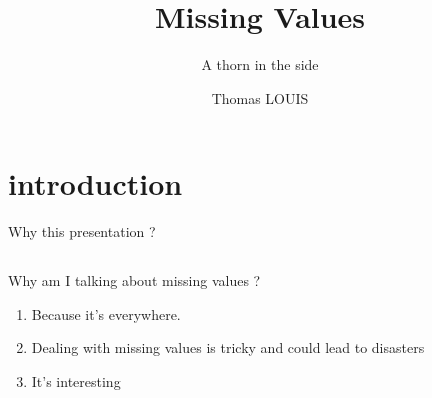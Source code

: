 \documentclass{beamer}
\title{Missing Values}
\subtitle{A thorn in the side}
\author{Thomas LOUIS}\institute{Data scientist}
\begin{document}
\begin{frame}
\titlepage
\end{frame}


\section{introduction}
\begin{frame}
	\begin{center}
	\Large Why this presentation ?
	\end{center}
\end{frame}

\begin{frame}
\end{frame}

%
%
\subsection[Missing values in Data Driven Business]{}
\begin{frame}
	Why am I talking about missing values ?
        \begin{enumerate}
		\item<1- | alert@1> Because it's everywhere.
		\item<2- | alert@2> Dealing with missing values is tricky and could lead to disasters  
		\item<3- | alert@3> It's interesting
	\end{enumerate}
\end{frame}
\end{document}
